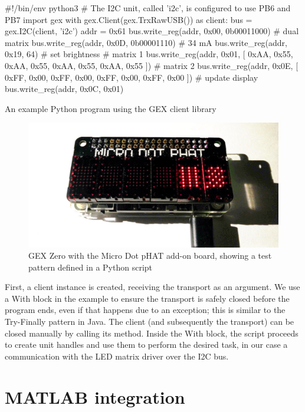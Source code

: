 \begin{listing}[h]
	\begin{pythoncode}
		#!/bin/env python3
		# The I2C unit, called 'i2c', is configured to use PB6 and PB7
		import gex
		with gex.Client(gex.TrxRawUSB()) as client:
		bus = gex.I2C(client, 'i2c')
		addr = 0x61
		bus.write_reg(addr, 0x00, 0b00011000) # dual matrix
		bus.write_reg(addr, 0x0D, 0b00001110) # 34 mA
		bus.write_reg(addr, 0x19, 64) # set brightness
		# matrix 1
		bus.write_reg(addr, 0x01, [
		0xAA, 0x55, 0xAA, 0x55,
		0xAA, 0x55, 0xAA, 0x55
		])
		# matrix 2
		bus.write_reg(addr, 0x0E, [
		0xFF, 0x00, 0xFF, 0x00,
		0xFF, 0x00, 0xFF, 0x00
		])
		# update display
		bus.write_reg(addr, 0x0C, 0x01)
	\end{pythoncode}
	\caption{\label{lst:py_api} An example Python program using the GEX client library}
\end{listing}

\begin{figure}[h]
	\centering
	\includegraphics[width=.7\textwidth] {img/phatmtx.jpg}
	\caption[GEX Zero with the Micro Dot pHAT add-on board]{\label{fig:pydemo}GEX Zero with the Micro Dot pHAT add-on board, showing a test pattern defined in a Python script}
\end{figure}

First, a client instance is created, receiving the transport as an argument. We use a With block in the example to ensure the transport is safely closed before the program ends, even if that happens due to an exception; this is similar to the Try-Finally pattern in Java. The client (and subsequently the transport) can be closed manually by calling its  method. Inside the With block, the script proceeds to create unit handles and use them to perform the desired task, in our case a communication with the \gls{LED} matrix driver over the \gls{I2C} bus.

\section{MATLAB integration}

